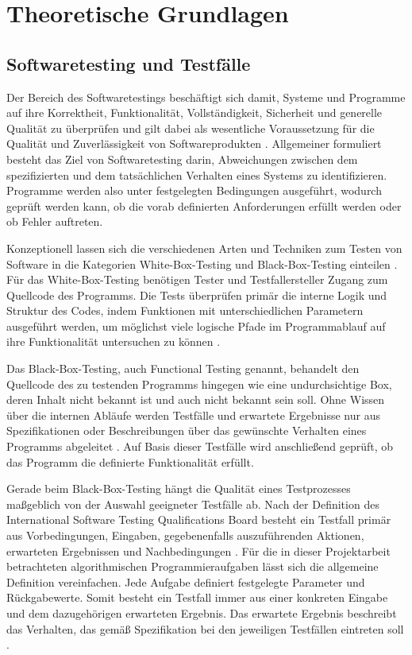 \section{Theoretische Grundlagen}

\subsection{Softwaretesting und Testfälle}
Der Bereich des Softwaretestings beschäftigt sich damit, Systeme und Programme 
auf ihre Korrektheit, Funktionalität, Vollständigkeit, Sicherheit und generelle Qualität 
zu überprüfen und gilt dabei als wesentliche Voraussetzung für die 
Qualität und Zuverlässigkeit von Softwareprodukten \cite{ehmer_comparative_2012, wang_software_2024}.
Allgemeiner formuliert besteht das Ziel von Softwaretesting darin, 
Abweichungen zwischen dem spezifizierten und dem tatsächlichen Verhalten eines Systems zu 
identifizieren. Programme werden also unter festgelegten Bedingungen ausgeführt, wodurch 
geprüft werden kann, ob die vorab definierten Anforderungen erfüllt werden oder ob Fehler 
auftreten.

Konzeptionell lassen sich die verschiedenen Arten und Techniken zum Testen von Software in die Kategorien White-Box-Testing 
und Black-Box-Testing einteilen \cite{nidhra_black_2012}. Für das White-Box-Testing benötigen
Tester und Testfallersteller Zugang zum Quellcode des Programms. Die Tests überprüfen primär die 
interne Logik und Struktur des Codes, indem Funktionen mit unterschiedlichen Parametern ausgeführt werden, um 
möglichst viele logische Pfade im Programmablauf auf ihre Funktionalität untersuchen zu können \cite{verma_comparative_2017}.

Das Black-Box-Testing, auch Functional Testing genannt, behandelt den Quellcode des zu testenden Programms 
hingegen wie eine undurchsichtige Box, deren Inhalt nicht bekannt ist und auch nicht bekannt sein soll. 
Ohne Wissen über die internen Abläufe werden Testfälle und erwartete Ergebnisse nur aus Spezifikationen 
oder Beschreibungen über das gewünschte Verhalten eines Programms abgeleitet \cite{verma_comparative_2017}. Auf Basis dieser 
Testfälle wird anschließend geprüft, ob das Programm die definierte Funktionalität erfüllt.

Gerade beim Black-Box-Testing hängt die Qualität eines Testprozesses maßgeblich von der Auswahl geeigneter Testfälle ab. 
Nach der Definition des International Software Testing Qualifications Board besteht ein Testfall primär aus Vorbedingungen, 
Eingaben, gegebenenfalls auszuführenden Aktionen, erwarteten Ergebnissen und Nachbedingungen \cite{istqb_testfall}. 
Für die in dieser Projektarbeit betrachteten algorithmischen Programmieraufgaben lässt sich die allgemeine Definition 
vereinfachen. Jede Aufgabe definiert festgelegte Parameter und Rückgabewerte. Somit besteht ein Testfall immer aus einer 
konkreten Eingabe und dem dazugehörigen erwarteten Ergebnis. Das erwartete Ergebnis beschreibt das Verhalten, 
das gemäß Spezifikation bei den jeweiligen Testfällen eintreten soll \cite{istqb_erwartetes_ergebnis}.



